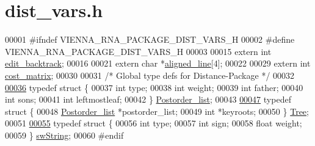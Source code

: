 \hypertarget{dist__vars_8h_source}{}\section{dist\+\_\+vars.\+h}
\label{dist__vars_8h_source}

\begin{DoxyCode}
00001 \textcolor{preprocessor}{#ifndef VIENNA\_RNA\_PACKAGE\_DIST\_VARS\_H}
00002 \textcolor{preprocessor}{#define VIENNA\_RNA\_PACKAGE\_DIST\_VARS\_H}
00003 
00015 \textcolor{keyword}{extern} \textcolor{keywordtype}{int}   \hyperlink{dist__vars_8h_aa03194c513af6b860e7b33e370b82bdb}{edit\_backtrack};
00016 
00021 \textcolor{keyword}{extern} \textcolor{keywordtype}{char} *\hyperlink{dist__vars_8h_ac1605fe3448ad0a0b809c4fb8f6a854a}{aligned\_line}[4];
00022 
00029 \textcolor{keyword}{extern} \textcolor{keywordtype}{int}  \hyperlink{dist__vars_8h_ab65d8ff14c6937612212526a60f59b3c}{cost\_matrix};
00030 
00031 \textcolor{comment}{/*  Global type defs for Distance-Package */}
00032 
\hyperlink{structPostorder__list}{00036} \textcolor{keyword}{typedef} \textcolor{keyword}{struct }\{
00037                  \textcolor{keywordtype}{int}  type;
00038                  \textcolor{keywordtype}{int}  weight;
00039                  \textcolor{keywordtype}{int}  father;
00040                  \textcolor{keywordtype}{int}  sons;
00041                  \textcolor{keywordtype}{int}  leftmostleaf;
00042                \} \hyperlink{structPostorder__list}{Postorder\_list};
00043 
\hyperlink{structTree}{00047} \textcolor{keyword}{typedef} \textcolor{keyword}{struct }\{
00048                  \hyperlink{structPostorder__list}{Postorder\_list} *postorder\_list;
00049                  \textcolor{keywordtype}{int}            *keyroots;
00050                \} \hyperlink{structTree}{Tree};
00051 
\hyperlink{structswString}{00055} \textcolor{keyword}{typedef} \textcolor{keyword}{struct }\{
00056                  \textcolor{keywordtype}{int}    type;
00057                  \textcolor{keywordtype}{int}    sign;
00058                  \textcolor{keywordtype}{float}  weight;
00059                \} \hyperlink{structswString}{swString};
00060 \textcolor{preprocessor}{#endif}
\end{DoxyCode}

